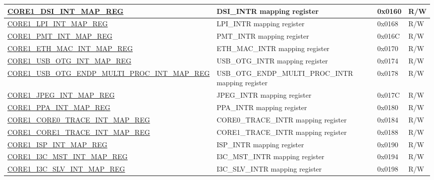 \begin{longtable}{ | p{7.5cm} | p{7.2cm} | p{1.3cm} | p{1cm} | }
\hyperref[regdesc:CORE1DSIINTMAPREG]{CORE1\_DSI\_INT\_MAP\_REG} & DSI\_INTR mapping register & 0x0160 & R/W \\ \hline


\hyperref[regdesc:CORE1LPIINTMAPREG]{CORE1\_LPI\_INT\_MAP\_REG} & LPI\_INTR mapping register & 0x0168 & R/W \\ \hline

\hyperref[regdesc:CORE1PMTINTMAPREG]{CORE1\_PMT\_INT\_MAP\_REG} & PMT\_INTR mapping register & 0x016C & R/W \\ \hline

\hyperref[regdesc:CORE1SBDINTMAPREG]{CORE1\_ETH\_MAC\_INT\_MAP\_REG} & ETH\_MAC\_INTR mapping register & 0x0170 & R/W \\ \hline

\hyperref[regdesc:CORE1USBOTGINTMAPREG]{CORE1\_USB\_OTG\_INT\_MAP\_REG} & USB\_OTG\_INTR mapping register & 0x0174 & R/W \\ \hline

\hyperref[regdesc:CORE1USBOTGENDPMULTIPROCINTMAPREG]{CORE1\_USB\_OTG\_ENDP\_MULTI\_PROC\_INT\_MAP\_REG} & USB\_OTG\_ENDP\_MULTI\_PROC\_INTR mapping register & 0x0178 & R/W \\ \hline

\hyperref[regdesc:CORE1JPEGINTMAPREG]{CORE1\_JPEG\_INT\_MAP\_REG} & JPEG\_INTR mapping register & 0x017C & R/W \\ \hline

\hyperref[regdesc:CORE1PPAINTMAPREG]{CORE1\_PPA\_INT\_MAP\_REG} & PPA\_INTR mapping register & 0x0180 & R/W \\ \hline

\hyperref[regdesc:CORE1CORE0TRACEINTMAPREG]{CORE1\_CORE0\_TRACE\_INT\_MAP\_REG} & CORE0\_TRACE\_INTR mapping register & 0x0184 & R/W \\ \hline

\hyperref[regdesc:CORE1CORE1TRACEINTMAPREG]{CORE1\_CORE1\_TRACE\_INT\_MAP\_REG} & CORE1\_TRACE\_INTR mapping register & 0x0188 & R/W \\ \hline

\hyperref[regdesc:CORE1ISPINTMAPREG]{CORE1\_ISP\_INT\_MAP\_REG} & ISP\_INTR mapping register & 0x0190 & R/W \\ \hline

\hyperref[regdesc:CORE1I3CMSTINTMAPREG]{CORE1\_I3C\_MST\_INT\_MAP\_REG} & I3C\_MST\_INTR mapping register & 0x0194 & R/W \\ \hline

\hyperref[regdesc:CORE1I3CSLVINTMAPREG]{CORE1\_I3C\_SLV\_INT\_MAP\_REG} & I3C\_SLV\_INTR mapping register & 0x0198 & R/W \\ \hline


\end{longtable}
